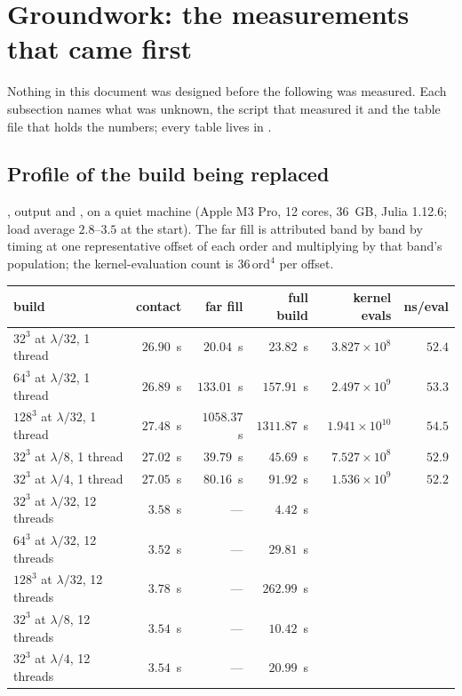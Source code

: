 \section{Groundwork: the measurements that came first}
\label{sec:grd}

Nothing in this document was designed before the following was measured. Each subsection
names what was unknown, the script that measured it and the table file that holds the
numbers; every table lives in .

\subsection{Profile of the build being replaced}
\label{sec:grd:prof}

, output  and
, on a quiet machine (Apple M3 Pro, 12 cores, 36~GB, Julia
1.12.6; load average $2.8$--$3.5$ at the start). The far fill is attributed band by band by
timing  at one representative offset of each  order and
multiplying by that band's population; the kernel-evaluation count is
$36\,\mathrm{ord}^4$ per offset.

\begin{center}\small
\begin{tabular}{@{}lrrrrr@{}}
\toprule
build & contact & far fill & full build & kernel evals & ns/eval\\
\midrule
$32^3$ at $\lambda/32$, 1 thread & $26.90$~s & $20.04$~s & $23.82$~s
& $3.827\times10^{8}$ & $52.4$\\
$64^3$ at $\lambda/32$, 1 thread & $26.89$~s & $133.01$~s & $157.91$~s
& $2.497\times10^{9}$ & $53.3$\\
$128^3$ at $\lambda/32$, 1 thread & $27.48$~s & $1058.37$~s & $1311.87$~s
& $1.941\times10^{10}$ & $54.5$\\
$32^3$ at $\lambda/8$, 1 thread & $27.02$~s & $39.79$~s & $45.69$~s
& $7.527\times10^{8}$ & $52.9$\\
$32^3$ at $\lambda/4$, 1 thread & $27.05$~s & $80.16$~s & $91.92$~s
& $1.536\times10^{9}$ & $52.2$\\
\midrule
$32^3$ at $\lambda/32$, 12 threads & $3.58$~s & --- & $4.42$~s & & \\
$64^3$ at $\lambda/32$, 12 threads & $3.52$~s & --- & $29.81$~s & & \\
$128^3$ at $\lambda/32$, 12 threads & $3.78$~s & --- & $262.99$~s & & \\
$32^3$ at $\lambda/8$, 12 threads & $3.54$~s & --- & $10.42$~s & & \\
$32^3$ at $\lambda/4$, 12 threads & $3.54$~s & --- & $20.99$~s & & \\
\bottomrule
\end{tabular}
\end{center}

